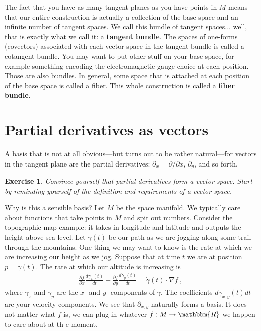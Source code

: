 \documentclass[
  11pt,
	colorful,
	raggedright,
]{tufte-style-thesis-flip}
\newtheorem{exercise}{Exercise}[section]
\begin{document}
The fact that you have as many tangent planes as you have points in $M$ means that our entire construction is actually a collection of the base space and an infinite number of tangent spaces. We call this bundle of tangent spaces... well, that is exactly what we call it: a \textbf{tangent bundle}. The spaces of one-forms (covectors) associated with each vector space in the tangent bundle is called a cotangent bundle. You may want to put other stuff on your base space, for example something encoding the electromagnetic gauge choice at each position. Those are also bundles. In general, some space that is attached at each position of the base space is called a fiber. This whole construction is called a \textbf{fiber bundle}.

\section{Partial derivatives as vectors}

A basis that is not at all obvious---but turns out to be rather natural---for vectors in the tangent plane are the partial derivatives: $\partial_x = \partial/\partial x$, $\partial_y$, and so forth. 
\begin{exercise}
Convince yourself that partial derivatives form a vector space. Start by reminding yourself of the definition and requirements of a vector space.
\end{exercise}
Why is this a sensible basis? Let $M$ be the space manifold. We typically care about functions that take points in $M$ and spit out numbers. Consider the topographic map example: it takes in longitude and latitude and outputs the height above sea level. Let $\gamma(t)$ be our path as we are jogging along some trail through the mountains. One thing we may want to know is the rate at which we are increasing our height as we jog. Suppose that at time $t$ we are at position $p = \gamma(t)$. The rate at which our altitude is increasing is 
\begin{align}
  \frac{\partial f}{\partial x}
  \frac{d\gamma_x(t)}{dt}
  +
  \frac{\partial f}{\partial y}
  \frac{d\gamma_y(t)}{dt} 
  =
  \dot\gamma(t)\cdot \nabla f
  \ ,
\end{align}
where $\gamma_x$ and $\gamma_y$ are the $x$- and $y$- components of $\gamma$. The coefficients ${d\gamma_{x,y}(t)}{dt}$ are your velocity components. We see that $\partial_{x,y}$ naturally forms a basis. It does not matter what $f$ is, we can plug in whatever $f: M\to \mathbbm{R}$ we happen to care about at th e moment.
\end{document}
